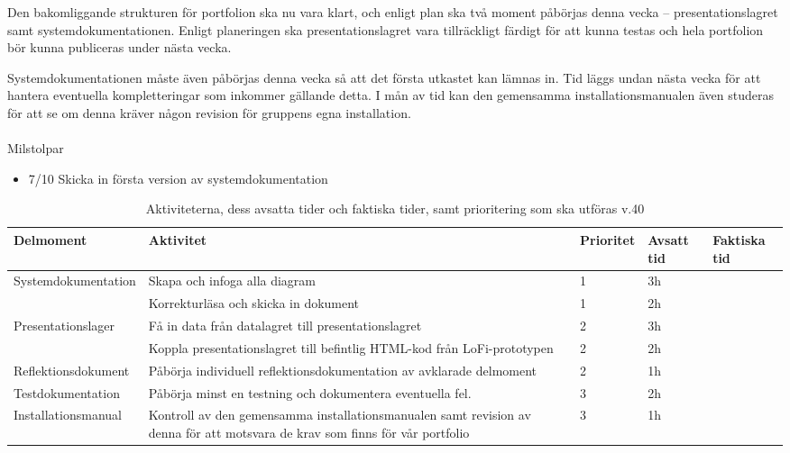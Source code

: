 \documentclass{TDP003mall}
\begin{document}
Den bakomliggande strukturen för portfolion ska nu vara klart, och enligt plan ska två moment påbörjas denna vecka -- presentationslagret samt systemdokumentationen. Enligt planeringen ska presentationslagret vara tillräckligt färdigt för att kunna testas och hela portfolion bör kunna publiceras under nästa vecka.

Systemdokumentationen måste även påbörjas denna vecka så att det första utkastet kan lämnas in. Tid läggs undan nästa vecka för att hantera eventuella kompletteringar som inkommer gällande detta. I mån av tid kan den gemensamma installationsmanualen även studeras för att se om denna kräver någon revision för gruppens egna installation.
\\
\\
Milstolpar
\begin{itemize}
\color{blue}
    \item 7/10 Skicka in första version av systemdokumentation
\end{itemize}

\begin{table}[h]
\begin{tabularx}{\textwidth}{|l|X|l|l|l|}
  \hline
Delmoment & Aktivitet & Prioritet & Avsatt tid & Faktiska tid\\ \hline
    \multirow{2}{*}{Systemdokumentation}  & Skapa och infoga alla diagram           & 1   & 3h         &     \\ \cline{2-5}
        & Korrekturläsa och skicka in dokument     & 1   & 2h       &     \\\hline
    \multirow{2}{*}{Presentationslager}   & Få in data från datalagret till presentationslagret  & 2 & 3h         &     \\  \cline{2-5}
        & Koppla presentationslagret till befintlig HTML-kod från LoFi-prototypen & 2 & 2h         &     \\  \hline
        Reflektionsdokument  & Påbörja individuell reflektionsdokumentation av avklarade delmoment                                   & 2   & 1h         &     \\   \hline
        Testdokumentation    & Påbörja minst en testning och dokumentera eventuella fel.   & 3 & 2h    &     \\  \hline
        Installationsmanual  & Kontroll av den gemensamma installationsmanualen samt revision av denna för att motsvara de krav som finns för vår portfolio                                   & 3   & 1h         &     \\   \hline
\end{tabularx}
\centering
    \caption{\label{tab:table-name}Aktiviteterna, dess avsatta tider och faktiska tider, samt prioritering som ska utföras v.40}

\end{table}
\end{document}
